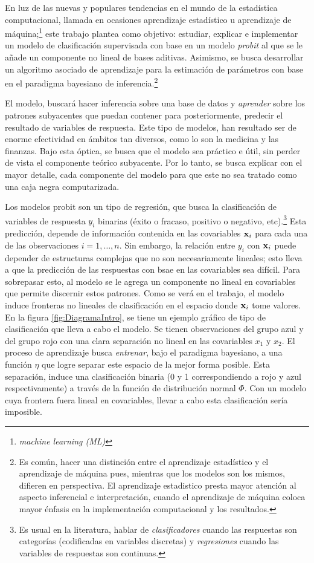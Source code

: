 \documentclass[../Main/Main.tex]{subfiles}
\begin{document}
En luz de las nuevas y populares tendencias en el mundo de la estadística computacional, llamada en ocasiones aprendizaje estadístico u aprendizaje de máquina;\footnote{\textit{machine learning (ML)}} este trabajo plantea como objetivo: estudiar, explicar e implementar un modelo de clasificación supervisada con base en un modelo \textit{probit} al que se le añade un componente no lineal de bases aditivas. Asimismo, se busca desarrollar un algoritmo asociado de aprendizaje para la estimación de parámetros con base en el paradigma bayesiano de inferencia.\footnote{Es común, hacer una distinción entre el aprendizaje estadístico y el aprendizaje de máquina pues, mientras que los modelos son los mismos, difieren en perspectiva. El aprendizaje estadistico presta mayor atención al aspecto inferencial e interpretación, cuando el aprendizaje de máquina coloca mayor énfasis en la implementación computacional y los resultados.}

El modelo, buscará hacer inferencia sobre una base de datos y \textit{aprender} sobre los patrones subyacentes que puedan contener para posteriormente, predecir el resultado de variables de respuesta. Este tipo de modelos, han resultado ser de enorme efectividad en ámbitos tan diversos, como lo son la medicina y las finanzas. Bajo esta óptica, se busca que el modelo sea práctico e útil, sin perder de vista el componente teórico subyacente. Por lo tanto, se busca explicar con el mayor detalle, cada componente del modelo para que este no sea tratado como una caja negra computarizada.

Los modelos probit son un tipo de regresión, que busca la clasificación de variables de respuesta $y_i$ binarias (éxito o fracaso, positivo o negativo, etc).\footnote{Es usual en la literatura, hablar de \textit{clasificadores} cuando las respuestas son categorías (codificadas en variables discretas) y \textit{regresiones} cuando las variables de respuestas son continuas.} Esta predicción, depende de información contenida en las covariables $\mathbf{x}_i$ para cada una de las observaciones $i = 1,\ldots,n$. Sin embargo, la relación entre $y_i$ con $\mathbf{x}_i$ puede depender de estructuras complejas que no son necesariamente lineales; esto lleva a que la predicción de las respuestas con bsae en las covariables sea difícil. Para sobrepasar esto, al modelo se le agrega un componente no lineal en covariables que permite discernir estos patrones. Como se verá en el trabajo, el modelo induce fronteras no lineales de clasificación en el espacio donde $\mathbf{x}_i$ tome valores. En la figura \ref{fig:DiagramaIntro}, se tiene un ejemplo gráfico de tipo de clasificación que lleva a cabo el modelo. Se tienen observaciones del grupo azul y del grupo rojo con una clara separación no lineal en las covariables $x_1$ y $x_2$. El proceso de aprendizaje busca \textit{entrenar}, bajo el paradigma bayesiano, a una función $\eta$ que logre separar este espacio de la mejor forma posible. Esta separación, induce una clasificación binaria (0 y 1 correspondiendo a rojo y azul respectivamente) a través de la función de distribución normal $\Phi$. Con un modelo cuya frontera fuera lineal en covariables, llevar a cabo esta clasificación sería imposible. 
\end{document}

